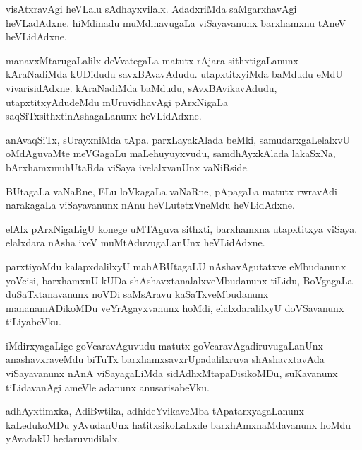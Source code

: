 \documentclass{article}
\begin{document}
\begin{mn}
visAtxravAgi heVLalu sAdhayxvilalx. AdadxriMda saMgarxhavAgi
heVLadAdxne. hiMdinadu muMdinavugaLa viSayavanunx barxhamxnu tAneV heVLidAdxne.
\end{mn}

\begin{mn}
manavxMtarugaLalilx deVvategaLa matutx rAjara sithxtigaLanunx
kAraNadiMda kUDidudu savxBAvavAdudu. utapxtitxyiMda baMdudu eMdU
vivarisidAdxne. kAraNadiMda baMdudu, sAvxBAvikavAdudu,
utapxtitxyAdudeMdu mUruvidhavAgi pArxNigaLa
saqSiTxsithxtinAshagaLanunx heVLidAdxne.
\end{mn}

\begin{mn}%
anAvaqSiTx, sUrayxniMda tApa. parxLayakAlada beMki, samudarxgaLelalxvU
oMdAguvaMte meVGagaLu maLehuyuyxvudu, samdhAyxkAlada lakaSxNa,
bArxhamxmuhUtaRda viSaya ivelalxvanUnx vaNiRside.
\end{mn}

\begin{mn}
BUtagaLa vaNaRne, ELu loVkagaLa vaNaRne, pApagaLa matutx rwravAdi
narakagaLa viSayavanunx nAnu heVLutetxVneMdu heVLidAdxne.
\end{mn}

\begin{mn}
elAlx pArxNigaLigU konege uMTAguva sithxti, barxhamxna utapxtitxya
viSaya. elalxdara nAsha iveV muMtAduvugaLanUnx heVLidAdxne.
\end{mn}

\begin{mn}%
parxtiyoMdu kalapxdalilxyU mahABUtagaLU nAshavAgutatxve eMbudanunx
yoVcisi, barxhamxnU kUDa shAshavxtanalalxveMbudanunx tiLidu, BoVgagaLa
duSaTxtanavanunx noVDi saMsAravu kaSaTxveMbudanunx mananamADikoMDu
veYrAgayxvanunx hoMdi, elalxdaralilxyU doVSavanunx tiLiyabeVku.
\end{mn}

\begin{mn}
iMdirxyagaLige goVcaravAguvudu matutx goVcaravAgadiruvugaLanUnx
anashavxraveMdu biTuTx barxhamxsavxrUpadalilxruva shAshavxtavAda
viSayavanunx nAnA viSayagaLiMda sidAdhxMtapaDisikoMDu, suKavanunx
tiLidavanAgi ameVle adanunx anusarisabeVku.
\end{mn}

\begin{mn}
adhAyxtimxka, AdiBwtika, adhideYvikaveMba tApatarxyagaLanunx
kaLedukoMDu yAvudanUnx hatitxsikoLaLxde barxhAmxnaMdavanunx hoMdu
yAvadakU hedaruvudilalx.
\end{mn}
\end{document}
